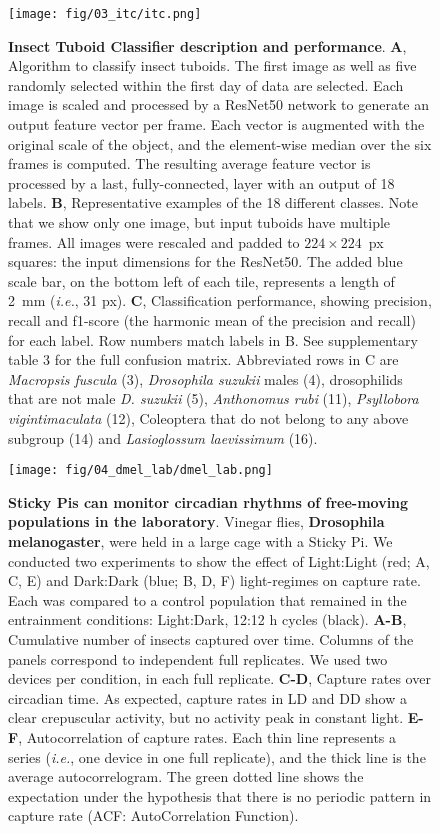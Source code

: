 \documentclass[12pt]{article}
\providecommand{\DIFaddtex}[1]{{\protect\color{blue}\uwave{#1}}} %
\providecommand{\DIFaddFL}[1]{\DIFadd{#1}} %
\providecommand{\DIFaddbeginFL}{} %
\providecommand{\DIFaddendFL}{} %
\providecommand{\DIFadd}[1]{\texorpdfstring{\DIFaddtex{#1}}{#1}} %
\newcommand{\DIFaddincludegraphics}[2][]{{\color{blue}\fbox{\DIFOincludegraphics[#1]{#2}}}} %
\DeclareRobustCommand{\DIFaddbeginFL}{\DIFOaddbeginFL \let\includegraphics\DIFaddincludegraphics} %
\DeclareRobustCommand{\DIFaddendFL}{\DIFOaddendFL \let\includegraphics\DIFOincludegraphics} %
\begin{document}
	\begin{figure}[ht]
		\centering
		\texttt{[image: fig/03\_itc/itc.png]}
		\caption{\textbf{Insect Tuboid Classifier description and performance}. \textbf{A}, Algorithm to classify insect tuboids. The first image as well as five randomly selected within the first day of data are selected. Each image is scaled and processed by a ResNet50 network to generate an output feature vector per frame. Each vector is augmented with the original scale of the object, and the element-wise median over the six frames is computed. The resulting average feature vector is processed by a last, fully-connected, layer with an output of 18 labels. 
		\textbf{B}, Representative examples of the 18 different classes. 
		Note that we show only one image, but input tuboids have multiple frames.
        All images were rescaled and padded to $224\times224$~px squares: the input dimensions for the ResNet50.
        The added blue scale bar, on the bottom left of each tile, represents a length of 2~mm (\emph{i.e.}, 31 px).
		\textbf{C}, Classification performance, showing precision, recall and f1-score (the harmonic mean of the precision and recall) for each label. 
		Row numbers match labels in B. See supplementary table 3 for the full confusion matrix.
		Abbreviated rows in C are \emph{Macropsis fuscula} (3), \emph{Drosophila suzukii} males (4), drosophilids that are not male \emph{D. suzukii} (5), \emph{Anthonomus rubi} (11), \emph{Psyllobora vigintimaculata} (12), Coleoptera that do not belong to any above subgroup (14) and \emph{Lasioglossum laevissimum} (16).
		}
		\label{fig:03}
	\end{figure}

	\pagebreak

	\begin{figure}[ht]
		\centering
		\texttt{[image: fig/04\_dmel\_lab/dmel\_lab.png]}
		\caption{\textbf{Sticky Pis can monitor circadian rhythms of free-moving populations in the laboratory}. Vinegar flies, \textbf{Drosophila melanogaster}, were held in a large cage with a Sticky Pi. We conducted two experiments to show the effect of Light:Light (red; A, C, E) and Dark:Dark (blue; B, D, F) light-regimes on capture rate. Each was compared to a control population that remained in the entrainment conditions: Light:Dark, 12:12 h cycles (black). \textbf{A-B}, Cumulative number of insects captured over time. Columns of the panels correspond to independent full replicates. We used two devices per condition, in each full replicate. \textbf{C-D}, Capture rates over circadian time. As expected, capture rates in LD and DD show a clear crepuscular activity, but no activity peak in constant light. \textbf{E-F}, Autocorrelation of capture rates. Each thin line represents a series (\emph{i.e.}, one device in one full replicate), and the thick line is the average autocorrelogram. The green dotted line shows the expectation under the hypothesis that there is no periodic pattern in capture rate (ACF: AutoCorrelation Function).
        \DIFaddbeginFL \DIFaddFL{The underlying data for this figure can be found on figshare\mbox{%
\cite{noauthor_datasets_2022}}\hskip0pt%
.
		}\DIFaddendFL }
		\label{fig:04}
	\end{figure}
\end{document}
